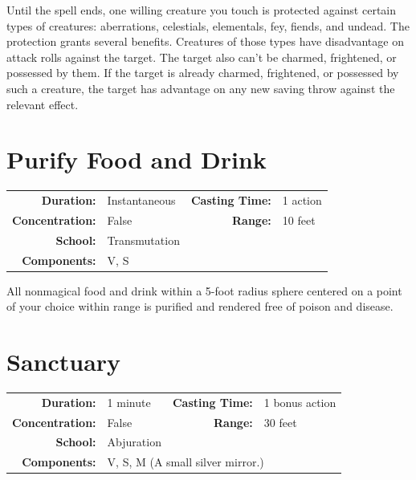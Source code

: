 \documentclass[12pt,showtrims]{memoir}
\begin{document}
\vspace{1\baselineskip}\noindent Until the spell ends, one willing creature you touch is protected against certain types of creatures: aberrations, celestials, elementals, fey, fiends, and undead. The protection grants several benefits. Creatures of those types have disadvantage on attack rolls against the target. The target also can't be charmed, frightened, or possessed by them. If the target is already charmed, frightened, or possessed by such a creature, the target has advantage on any new saving throw against the relevant effect.

\newpage
\section*{Purify Food and Drink}

{
\small\centering\vspace{-6pt}
\begin{tabular}{rlrl}
\toprule

\textbf{Duration:} & Instantaneous &
\textbf{Casting Time:} & 1 action \\
\textbf{Concentration:} & False &
\textbf{Range:} & 10 feet \\
\textbf{School:} & Transmutation \\
\textbf{Components:} & \multicolumn{3}{p{0.7\textwidth}}{V, S}\\

\bottomrule
\end{tabular}
}

\vspace{1\baselineskip}\noindent All nonmagical food and drink within a 5-foot radius sphere centered on a point of your choice within range is purified and rendered free of poison and disease.

\newpage
\section*{Sanctuary}

{
\small\centering\vspace{-6pt}
\begin{tabular}{rlrl}
\toprule

\textbf{Duration:} & 1 minute &
\textbf{Casting Time:} & 1 bonus action \\
\textbf{Concentration:} & False &
\textbf{Range:} & 30 feet \\
\textbf{School:} & Abjuration \\
\textbf{Components:} & \multicolumn{3}{p{0.7\textwidth}}{V, S, M (A small silver mirror.)}\\

\bottomrule
\end{tabular}
}
\end{document}
